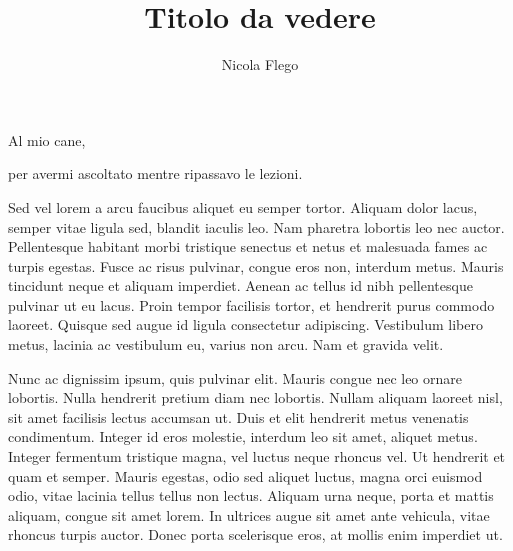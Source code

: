 \documentclass[target=mst,aauheader=aics,style=]{thud}
\title{Titolo da vedere}
\author{Nicola Flego}
\begin{document}
\maketitle

\begin{dedication}
	Al mio cane,\par per avermi ascoltato mentre ripassavo le lezioni.
\end{dedication}

\acknowledgements
Sed vel lorem a arcu faucibus aliquet eu semper tortor. Aliquam dolor lacus, semper vitae ligula sed, blandit iaculis leo. Nam pharetra lobortis leo nec auctor. Pellentesque habitant morbi tristique senectus et netus et malesuada fames ac turpis egestas. Fusce ac risus pulvinar, congue eros non, interdum metus. Mauris tincidunt neque et aliquam imperdiet. Aenean ac tellus id nibh pellentesque pulvinar ut eu lacus. Proin tempor facilisis tortor, et hendrerit purus commodo laoreet. Quisque sed augue id ligula consectetur adipiscing. Vestibulum libero metus, lacinia ac vestibulum eu, varius non arcu. Nam et gravida velit.

\abstract
Nunc ac dignissim ipsum, quis pulvinar elit. Mauris congue nec leo ornare lobortis. Nulla hendrerit pretium diam nec lobortis. Nullam aliquam laoreet nisl, sit amet facilisis lectus accumsan ut. Duis et elit hendrerit metus venenatis condimentum. Integer id eros molestie, interdum leo sit amet, aliquet metus. Integer fermentum tristique magna, vel luctus neque rhoncus vel. Ut hendrerit et quam et semper. Mauris egestas, odio sed aliquet luctus, magna orci euismod odio, vitae lacinia tellus tellus non lectus. Aliquam urna neque, porta et mattis aliquam, congue sit amet lorem. In ultrices augue sit amet ante vehicula, vitae rhoncus turpis auctor. Donec porta scelerisque eros, at mollis enim imperdiet ut. 

\tableofcontents

\listoftables

\listoffigures

\mainmatter

\end{document}
